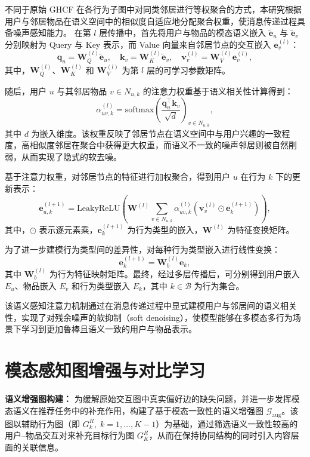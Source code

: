 不同于原始 GHCF 在各行为子图中对同类邻居进行等权聚合的方式，本研究根据用户与邻居物品在语义空间中的相似度自适应地分配聚合权重，使消息传递过程具备噪声感知能力。  
在第 $l$ 层传播中，首先将用户与物品的模态语义嵌入 $\widetilde{\mathbf{e}}_u$ 与 $\widetilde{\mathbf{e}}_v$ 分别映射为 Query 与 Key 表示，而 Value 向量来自邻居节点的交互嵌入 $\mathbf{e}_v^{(l)}$：
\begin{equation}
\mathbf{q}_u = \mathbf{W}_Q^{(l)} \widetilde{\mathbf{e}}_u, \quad
\mathbf{k}_v = \mathbf{W}_K^{(l)} \widetilde{\mathbf{e}}_v, \quad
\mathbf{v}_v^{(l)} = \mathbf{W}_V^{(l)} \mathbf{e}_v^{(l)},
\end{equation}
其中，$\mathbf{W}_Q^{(l)}$、$\mathbf{W}_K^{(l)}$ 和 $\mathbf{W}_V^{(l)}$ 为第 $l$ 层的可学习参数矩阵。

随后，用户 $u$ 与其邻居物品 $v \in N_{u,k}$ 的注意力权重基于语义相关性计算得到：
\begin{equation}
\alpha^{(l)}_{uv,k} =
\mathrm{softmax}\!\left(
\frac{\mathbf{q}_u^\top \mathbf{k}_v}{\sqrt{d}}
\right)_{v \in N_{u,k}},
\end{equation}
其中 $d$ 为嵌入维度。该权重反映了邻居节点在语义空间中与用户兴趣的一致程度，高相似度邻居在聚合中获得更大权重，而语义不一致的噪声邻居则被自然削弱，从而实现了隐式的软去噪。

基于注意力权重，对邻居节点的特征进行加权聚合，得到用户 $u$ 在行为 $k$ 下的更新表示：
\begin{equation}
\mathbf{e}^{(l+1)}_{u,k} =
\mathrm{LeakyReLU}\!\left(
\mathbf{W}^{(l)}
\sum_{v \in N_{u,k}}
\alpha^{(l)}_{uv,k}
\left(
\mathbf{v}_v^{(l)} \odot \mathbf{e}_k^{(l+1)}
\right)
\right),
\end{equation}
其中，$\odot$ 表示逐元素乘，$\mathbf{e}_k^{(l+1)}$ 为行为类型的嵌入，$\mathbf{W}^{(l)}$ 为特征变换矩阵。

为了进一步建模行为类型间的差异性，对每种行为类型嵌入进行线性变换：
\begin{equation}
\mathbf{e}_k^{(l+1)} = \mathbf{W}_b^{(l)} \mathbf{e}_k,
\end{equation}
其中 $\mathbf{W}_b^{(l)}$ 为行为特征映射矩阵。最终，经过多层传播后，可分别得到用户嵌入 $E_u$、物品嵌入 $E_v$ 和行为类型嵌入 $E_k$，其中 $k \in \mathcal{B}$ 为行为集合。

该语义感知注意力机制通过在消息传递过程中显式建模用户与邻居间的语义相关性，实现了对残余噪声的软抑制（soft denoising），使模型能够在多模态多行为场景下学习到更加鲁棒且语义一致的用户与物品表示。


\section{模态感知图增强与对比学习}
\textbf{语义增强图构建：}  
为缓解原始交互图中真实偏好边的缺失问题，并进一步发挥模态语义在推荐任务中的补充作用，构建了基于模态一致性的语义增强图 $\mathcal{G}_{\mathrm{aug}}$。该图以辅助行为图（即 $G^R_k, \; k = 1, \ldots, K-1$）为基础，通过筛选语义一致性较高的用户–物品交互对来补充目标行为图 $G^R_K$，从而在保持协同结构的同时引入内容层面的关联信息。

